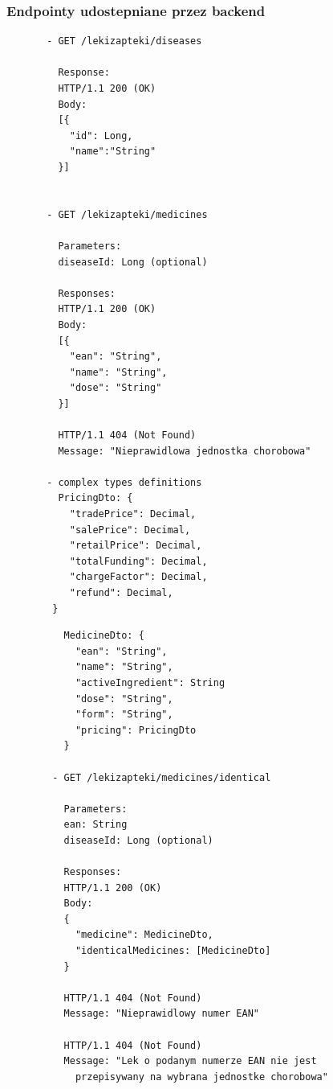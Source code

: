\documentclass{article}
\begin{document}
    \subsubsection{Endpointy udostepniane przez backend}
    \noindent
    \begin{minipage}{.45\textwidth}
     \begin{lstlisting}
       - GET /lekizapteki/diseases

         Response:
         HTTP/1.1 200 (OK)
         Body:
         [{
           "id": Long,
           "name":"String"
         }]


       - GET /lekizapteki/medicines

         Parameters:
         diseaseId: Long (optional)

         Responses:
         HTTP/1.1 200 (OK)
         Body:
         [{
           "ean": "String",
           "name": "String",
           "dose": "String"
         }]

         HTTP/1.1 404 (Not Found)
         Message: "Nieprawidlowa jednostka chorobowa"

       - complex types definitions
         PricingDto: {
           "tradePrice": Decimal,
           "salePrice": Decimal,
           "retailPrice": Decimal,
           "totalFunding": Decimal,
           "chargeFactor": Decimal,
           "refund": Decimal,
        }

     \end{lstlisting}
    \end{minipage}\hfill
    \begin{minipage}{.45\textwidth}
      \begin{lstlisting}
          MedicineDto: {
            "ean": "String",
            "name": "String",
            "activeIngredient": String
            "dose": "String",
            "form": "String",
            "pricing": PricingDto
          }

        - GET /lekizapteki/medicines/identical

          Parameters:
          ean: String
          diseaseId: Long (optional)

          Responses:
          HTTP/1.1 200 (OK)
          Body:
          {
            "medicine": MedicineDto,
            "identicalMedicines: [MedicineDto]
          }

          HTTP/1.1 404 (Not Found)
          Message: "Nieprawidlowy numer EAN"

          HTTP/1.1 404 (Not Found)
          Message: "Lek o podanym numerze EAN nie jest
            przepisywany na wybrana jednostke chorobowa"
      \end{lstlisting}
    \end{minipage}
\end{document}
